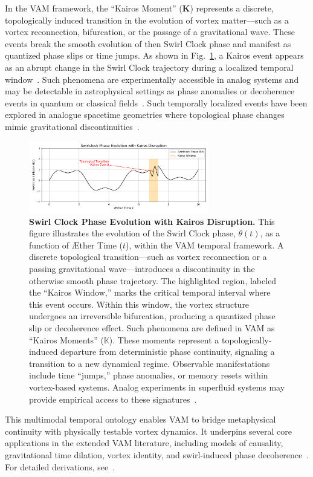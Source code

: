 In the VAM framework, the “Kairos Moment” ($\mathbb{\boldsymbol{K}}$) represents a discrete, topologically induced transition in the evolution of vortex matter—such as a vortex reconnection, bifurcation, or the passage of a gravitational wave. These events break the smooth evolution of then Swirl Clock phase and manifest as quantized phase slips or time jumps. As shown in Fig.~\ref{fig:kairos_moment}, a Kairos event appears as an abrupt change in the Swirl Clock trajectory during a localized temporal window~\cite{buhler2005wave}. Such phenomena are experimentally accessible in analog systems and may be detectable in astrophysical settings as phase anomalies or decoherence events in quantum or classical fields~\cite{VAM-13, VAM-15}. Such temporally localized events have been explored in analogue spacetime geometries where topological phase changes mimic gravitational discontinuities~\cite{barcelo2005}.


\begin{figure}[htb]
    \centering
    \includegraphics[width=0.7\textwidth]{TemporalOntologyKairosMoment}
    \caption{
        \textbf{Swirl Clock Phase Evolution with Kairos Disruption.}
        This figure illustrates the evolution of the Swirl Clock phase, \(\theta(t)\), as a function of Æther Time (\(t
        \)), within the VAM temporal framework. A discrete topological transition—such as vortex reconnection or a passing gravitational wave—introduces a discontinuity in the otherwise smooth phase trajectory.
        The highlighted region, labeled the “Kairos Window,” marks the critical temporal interval where this event occurs. Within this window, the
    vortex structure undergoes an irreversible bifurcation, producing a quantized phase slip or decoherence effect. Such phenomena are defined in VAM as “Kairos Moments” (\(\mathbb{{K}}\)).
        These moments represent a topologically-induced departure from deterministic phase continuity, signaling a transition to a new dynamical regime. Observable manifestations include time “jumps,” phase anomalies, or memory resets within vortex-based systems. Analog experiments in superfluid systems may provide empirical access to these signatures~\cite{VAM-13, VAM-15}.
    }
    \label{fig:kairos_moment}
\end{figure}

This multimodal temporal ontology enables VAM to bridge metaphysical continuity with physically testable vortex dynamics. It underpins several core applications in the extended VAM literature, including models of causality, gravitational time dilation, vortex identity, and swirl-induced phase decoherence~\cite{VAM-1, VAM-2, VAM-8, VAM-13, VAM-15}. For detailed derivations, see~\cite{VAM-2, VAM-8, VAM-13, VAM-15}.